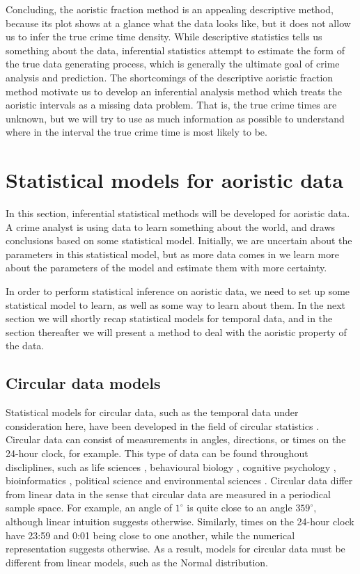 Concluding, the aoristic fraction method is an appealing descriptive method, because its plot shows at a glance what the data looks like, but it does not allow us to infer the true crime time density. While descriptive statistics tells us something about the data, inferential statistics attempt to estimate the form of the true data generating process, which is generally the ultimate goal of crime analysis and prediction. The shortcomings of the descriptive aoristic fraction method  motivate us to develop an inferential analysis method which treats the aoristic intervals as a missing data problem. That is, the true crime times are unknown, but we will try to use as much information as possible to understand where in the interval the true crime time is most likely to be.

\section{Statistical models for aoristic data} \label{param}

In this section, inferential statistical methods will be developed for aoristic data. A crime analyst is using data to learn something about the world, and draws conclusions based on some statistical model. Initially, we are uncertain about the parameters in this statistical model, but as more data comes in we learn more about the parameters of the model and estimate them with more certainty.

In order to perform statistical inference on aoristic data, we need to set up some statistical model to learn, as well as some way to learn about them. In the next section we will shortly recap statistical models for temporal data, and in the section thereafter we will present a method to deal with the aoristic property of the data.

\subsection{Circular data models} \label{ref}

Statistical models for circular data, such as the temporal data under consideration here, have been developed in the field of circular statistics \citep{fisher1995statistical, mardia2009directional, pewsey2013circular}.
Circular data can consist of measurements in angles, directions, or times on the 24-hour clock, for example. This type of data can be found throughout discliplines, such as life sciences \citep{mardianew}, behavioural biology \citep{bulbert2015danger}, cognitive psychology \citep{kaas2006haptic}, bioinformatics \citep{mardia2008multivariate}, political science \citep{gill2010} and environmental sciences \citep{lagona2016regression, lagona2015hidden, arnold2006recent}. Circular data differ from linear data in the sense that circular data are measured in a periodical sample space. For example, an angle of $1^{\circ}$ is quite close to an angle $359^{\circ},$ although linear intuition suggests otherwise. Similarly, times on the 24-hour clock have 23:59 and 0:01 being close to one another, while the numerical representation suggests otherwise. As a result, models for circular data must be different from linear models, such as the Normal distribution.

